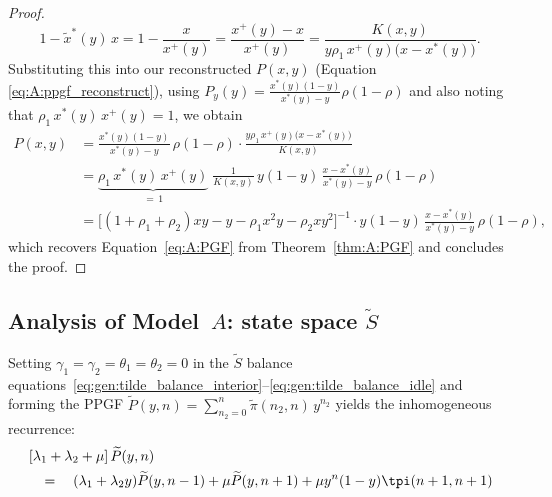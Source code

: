 \begin{proof}
    \begin{equation*}
        1-\widetilde{x}^*(y)\,x = 1 - \frac{x}{x^{+}(y)} = \frac{x^{+}(y)-x}{x^{+}(y)}
        = \frac{K(x,y)}{y\rho_1\,x^{+}(y)\bigl(x-x^*(y)\bigr)}.
    \end{equation*}
    Substituting this into our reconstructed $P(x,y)$ (Equation \eqref{eq:A:ppgf_reconstruct}), using 
    $P_y(y)=\frac{x^*(y)(1-y)}{x^*(y)-y}\rho(1-\rho)$ and also noting that $\rho_1\,x^*(y)\,x^{+}(y)=1$, we obtain
    \begin{align*}
        P(x,y)
        &= \frac{x^*(y)(1-y)}{x^*(y)-y}\,\rho(1-\rho)
           \cdot \frac{y\rho_1\,x^{+}(y)\bigl(x-x^*(y)\bigr)}{K(x,y)} \\
        &= \underbrace{\rho_1\,x^*(y)\,x^{+}(y)}_{=\,1}\;
           \frac{1}{K(x,y)}\, y(1-y)\,\frac{x-x^*(y)}{x^*(y)-y}\,\rho(1-\rho) \\
        &= \bigl[(1+\rho_1+\rho_2)xy - y - \rho_1 x^2 y - \rho_2 x y^2\bigr]^{-1}
           \cdot y(1-y)\,\frac{x-x^*(y)}{x^*(y)-y}\,\rho(1-\rho),
    \end{align*}
    which recovers Equation~\eqref{eq:A:PGF} from Theorem~\ref{thm:A:PGF} and concludes the proof.
\end{proof}


\subsection{Analysis of Model~\texorpdfstring{$A$}{A}: state space \texorpdfstring{$\widetilde{S}$}{S~}}

Setting $\gamma_1=\gamma_2=\theta_1=\theta_2=0$ in the $\widetilde{S}$ balance
equations~\eqref{eq:gen:tilde_balance_interior}--\eqref{eq:gen:tilde_balance_idle}
and forming the PPGF $\widetilde{P}(y,n)=\sum_{n_2=0}^n \widetilde{\pi}(n_2,n)\,y^{n_2}$
yields the inhomogeneous recurrence:
\begin{align}
    \begin{split}
       &\left[ \lambda_1 + \lambda_2 + \mu \right] \widetilde{P}(y,n) \\
       & \quad = \quad(\lambda_1 + \lambda_2 y) \widetilde{P}(y,n-1) + \mu \widetilde{P}(y,n+1)
                  + \mu y^n (1-y) \tpi(n+1,n+1)
    \end{split} \label{eq:A:ppgf_Stilde_dynamics}
\end{align}

